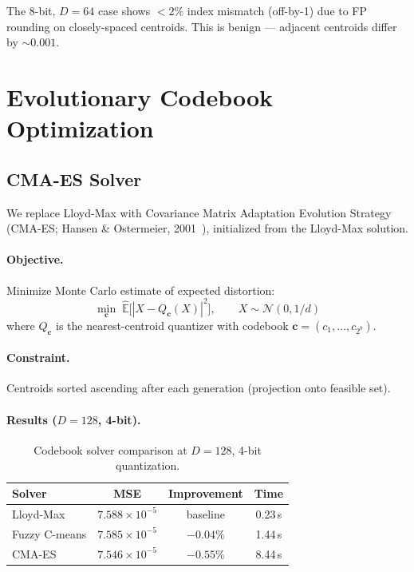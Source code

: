 \documentclass[11pt,a4paper]{article}
\begin{document}
The 8-bit, $D=64$ case shows $<2\%$ index mismatch (off-by-1) due to FP rounding on closely-spaced centroids. This is benign --- adjacent centroids differ by ${\sim}0.001$.

\section{Evolutionary Codebook Optimization}

\subsection{CMA-ES Solver}

We replace Lloyd-Max with Covariance Matrix Adaptation Evolution Strategy (CMA-ES; Hansen \& Ostermeier, 2001~\cite{hansen2001cmaes}), initialized from the Lloyd-Max solution.

\paragraph{Objective.} Minimize Monte Carlo estimate of expected distortion:
\begin{equation}\label{eq:cmaes-objective}
  \min_{\mathbf{c}} \; \hat{\mathbb{E}}\bigl[|X - Q_{\mathbf{c}}(X)|^2\bigr], \qquad X \sim \mathcal{N}(0, 1/d)
\end{equation}
where $Q_{\mathbf{c}}$ is the nearest-centroid quantizer with codebook $\mathbf{c} = (c_1, \ldots, c_{2^b})$.

\paragraph{Constraint.} Centroids sorted ascending after each generation (projection onto feasible set).

\paragraph{Results ($D=128$, 4-bit).}

\begin{table}[h]
\centering
\caption{Codebook solver comparison at $D=128$, 4-bit quantization.}
\label{tab:codebook-solvers}
\begin{tabular}{lccc}
\toprule
\textbf{Solver} & \textbf{MSE} & \textbf{Improvement} & \textbf{Time} \\
\midrule
Lloyd-Max           & $7.588 \times 10^{-5}$ & baseline      & 0.23\,s \\
Fuzzy C-means       & $7.585 \times 10^{-5}$ & $-0.04\%$     & 1.44\,s \\
CMA-ES              & $7.546 \times 10^{-5}$ & $\mathbf{-0.55\%}$ & 8.44\,s \\
\bottomrule
\end{tabular}
\end{table}
\end{document}

